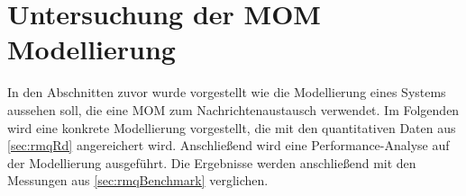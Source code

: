 








\section{Untersuchung der MOM Modellierung}
In den Abschnitten zuvor wurde vorgestellt wie die Modellierung eines Systems aussehen soll, die eine MOM zum Nachrichtenaustausch verwendet. Im Folgenden wird eine konkrete Modellierung vorgestellt, die mit den quantitativen Daten aus \autoref{sec:rmqRd} angereichert wird. Anschließend wird eine Performance-Analyse auf der Modellierung ausgeführt. Die Ergebnisse werden anschließend mit den Messungen aus \autoref{sec:rmqBenchmark} verglichen.

